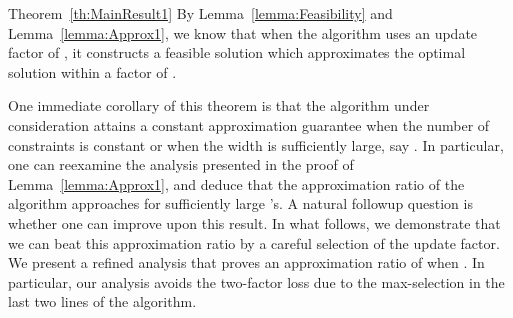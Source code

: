 \documentclass[11pt]{article}
\theoremstyle{plain}
\theoremstyle{definition}
\begin{document}
\begin{proofof}{Theorem~\ref{th:MainResult1}}
By Lemma~\ref{lemma:Feasibility} and Lemma~\ref{lemma:Approx1}, we
know that when the algorithm uses an update factor of , it constructs a feasible solution which approximates the
optimal solution within a factor of .~
\end{proofof}

One immediate corollary of this theorem is that the algorithm
under consideration attains a constant approximation guarantee
when the number of constraints is constant or when the width is
sufficiently large, say . In particular, one
can reexamine the analysis presented in the proof of
Lemma~\ref{lemma:Approx1}, and deduce that the approximation ratio
of the algorithm approaches  for sufficiently large
's. A natural followup question is whether one can improve upon
this result. In what follows, we demonstrate that we can beat this
approximation ratio by a careful selection of the update factor.
We present a refined analysis that proves an approximation ratio
of  when . In particular, our analysis avoids the two-factor
loss due to the max-selection in the last two lines of the
algorithm.
\end{document}
